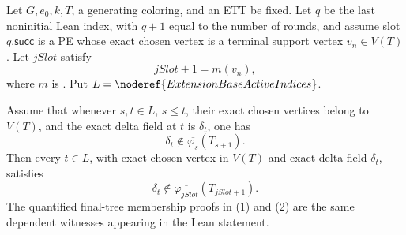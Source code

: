 \begin{helper}
Let \(G,e_0,k,T\), a generating coloring, and an ETT be fixed.  Let \(q\)
be the last noninitial Lean index, with \(q+1\) equal to the number of
rounds, and assume slot \(q.\mathsf{succ}\) is a PE whose exact chosen vertex
is a terminal support vertex \(v_n\in V(T)\).  Let \(jSlot\) satisfy
\[
 jSlot+1=m(v_n),
\]
where \(m\) is .  Put
\(L=\noderef{ExtensionBaseActiveIndices}\).

Assume that whenever \(s,t\in L\), \(s\le t\), their exact chosen vertices
belong to \(V(T)\), and the exact delta field at \(t\) is \(\delta_t\), one
has
\[
 \delta_t\notin\overline{\varphi_s}(T_{s+1}).               \tag{1}
\]
Then every \(t\in L\), with exact chosen vertex in \(V(T)\) and exact delta
field \(\delta_t\), satisfies
\[
 \delta_t\notin
 \overline{\varphi_{jSlot}}(T_{jSlot+1}).                   \tag{2}
\]
The quantified final-tree membership proofs in (1) and (2) are the same
dependent witnesses appearing in the Lean statement.
\end{helper}
